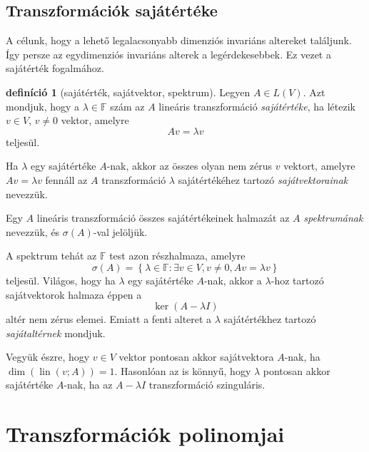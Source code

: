 \documentclass[a4paper, showtrims]{memoir}
\theoremstyle{plain}
\theoremstyle{remark}
\theoremstyle{definition}
\newtheorem{definition}[proposition]{definíció}
\DeclareMathOperator{\lin}{lin}
\begin{document}
\section{Transzformációk sajátértéke}
A célunk, hogy a lehető legalacsonyabb dimenziós invariáns altereket találjunk.
Így persze az egydimenziós invariáns alterek a legérdekesebbek.
Ez vezet a sajátérték fogalmához.
\begin{definition}[sajátérték, sajátvektor, spektrum]
	Legyen $A\in L\left( V \right)$.
	Azt mondjuk, hogy a $\lambda\in\mathbb{F}$ szám az $A$ lineáris transzformáció
	\emph{sajátértéke},
	ha létezik $v\in V$, $v\neq 0$ vektor, amelyre
	\[
		Av=\lambda v
	\]
	teljesül.

	Ha $\lambda$ egy sajátértéke $A$-nak,
	akkor az összes olyan nem zérus $v$ vektort,
	amelyre $Av=\lambda v$ fennáll az $A$ transzformáció $\lambda$ sajátértékéhez tartozó
	\emph{sajátvektorainak} nevezzük.

	Egy $A$ lineáris transzformáció összes sajátértékeinek halmazát az
	$A$ \emph{spektrumának} nevezzük, és
	$\sigma\left( A \right)$-val jelöljük.
\end{definition}
A spektrum tehát az $\mathbb{F}$ test azon részhalmaza, amelyre
\[
	\sigma\left( A \right)
	=
	\left\{
	\lambda\in\mathbb{F}:\exists v\in V, v\neq 0, Av=\lambda v
	\right\}
\]
teljesül.
Világos, hogy ha $\lambda$ egy sajátértéke $A$-nak, akkor a $\lambda$-hoz tartozó
sajátvektorok halmaza éppen a
\[
	\ker\left( A-\lambda I \right)
\]
altér nem zérus elemei.
Emiatt a fenti alteret a $\lambda$ sajátértékhez tartozó \emph{sajátaltérnek}
mondjuk.

Vegyük észre,
hogy $v\in V$ vektor pontosan akkor sajátvektora $A$-nak, ha $\dim\left( \lin\left( v;A \right) \right)=1$.
Hasonlóan az is könnyű, hogy $\lambda$ pontosan akkor sajátértéke $A$-nak,
ha az $A-\lambda I$ transzformáció szinguláris.

\chapter{Transzformációk polinomjai}
\end{document}

